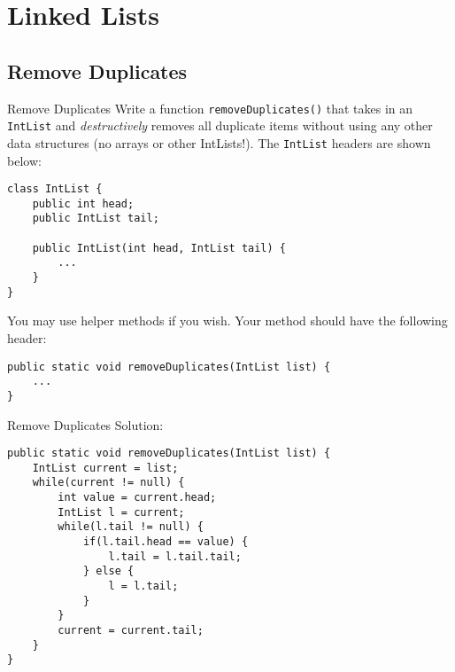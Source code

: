 \documentclass[9pt]{beamer}
\begin{document}
\section{Linked Lists}
\subsection{Remove Duplicates}
\begin{frame}[fragile]{Remove Duplicates}
  Write a function {\tt removeDuplicates()} that takes in an {\tt IntList} and
  {\em destructively} removes all duplicate items without using any other data
  structures (no arrays or other IntLists!). The {\tt IntList} headers are shown
  below:
  \begin{lstlisting}
class IntList {
    public int head;
    public IntList tail;

    public IntList(int head, IntList tail) {
        ...
    }
}
  \end{lstlisting}
  You may use helper methods if you wish. Your method should have the following
  header:
  \begin{lstlisting}
public static void removeDuplicates(IntList list) {
    ...
}
  \end{lstlisting}
\end{frame}

\begin{frame}[fragile]{Remove Duplicates}
Solution:
  \begin{lstlisting}
public static void removeDuplicates(IntList list) {
    IntList current = list;
    while(current != null) {
        int value = current.head;
        IntList l = current;
        while(l.tail != null) {
            if(l.tail.head == value) {
                l.tail = l.tail.tail;
            } else {
                l = l.tail;
            }
        }
        current = current.tail;
    }
}
  \end{lstlisting}
\end{frame}
\end{document}
